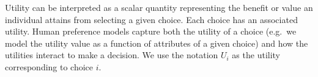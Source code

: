 \documentclass[
  letterpaper,
  DIV=11,
  numbers=noendperiod,
  oneside]{scrreprt}
\theoremstyle{remark}
\begin{document}
Utility can be interpreted as a scalar quantity representing the benefit
or value an individual attains from selecting a given choice. Each
choice has an associated utility. Human preference models capture both
the utility of a choice (e.g.~we model the utility value as a function
of attributes of a given choice) and how the utilities interact to make
a decision. We use the notation \(U_i\)
as the utility corresponding to choice \(i\).
\end{document}
